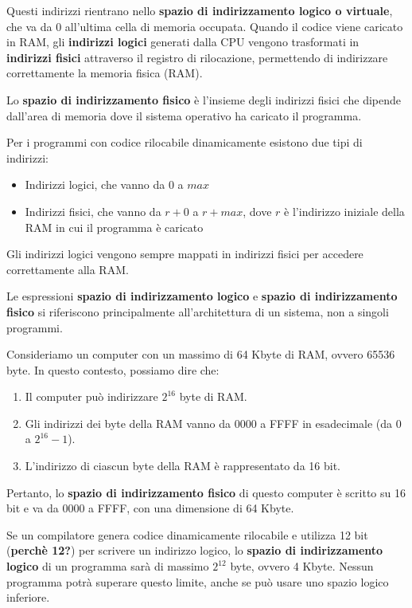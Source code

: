Questi indirizzi rientrano nello \textbf{spazio di indirizzamento logico o virtuale}, che va da 0 all'ultima cella di memoria occupata. Quando il codice viene caricato in RAM, gli \textbf{indirizzi logici} generati dalla CPU vengono trasformati in \textbf{indirizzi fisici} attraverso il registro di rilocazione, permettendo di indirizzare correttamente la memoria fisica (RAM).

Lo \textbf{spazio di indirizzamento fisico} è l'insieme degli indirizzi fisici che dipende dall'area di memoria dove il sistema operativo ha caricato il programma.

Per i programmi con codice rilocabile dinamicamente esistono due tipi di indirizzi:
\begin{itemize}
    \item Indirizzi logici, che vanno da $0$ a $max$
    \item Indirizzi fisici, che vanno da $r+0$ a $r+max$, dove $r$ è l'indirizzo iniziale della RAM in cui il programma è caricato
\end{itemize}

Gli indirizzi logici vengono sempre mappati in indirizzi fisici per accedere correttamente alla RAM.

Le espressioni \textbf{spazio di indirizzamento logico} e \textbf{spazio di indirizzamento fisico} si riferiscono principalmente all'architettura di un sistema, non a singoli programmi.

Consideriamo un computer con un massimo di 64 Kbyte di RAM, ovvero 65536 byte. In questo contesto, possiamo dire che:
\begin{enumerate}
    \item Il computer può indirizzare $2^{16}$ byte di RAM.
    \item Gli indirizzi dei byte della RAM vanno da 0000 a FFFF in esadecimale (da 0 a $2^{16} - 1$).
    \item L'indirizzo di ciascun byte della RAM è rappresentato da 16 bit.
\end{enumerate}

Pertanto, lo \textbf{spazio di indirizzamento fisico} di questo computer è scritto su 16 bit e va da 0000 a FFFF, con una dimensione di 64 Kbyte.

Se un compilatore genera codice dinamicamente rilocabile e utilizza 12 bit (\textbf{perchè 12?}) per scrivere un indirizzo logico, lo \textbf{spazio di indirizzamento logico} di un programma sarà di massimo $2^{12}$ byte, ovvero 4 Kbyte. Nessun programma potrà superare questo limite, anche se può usare uno spazio logico inferiore.


